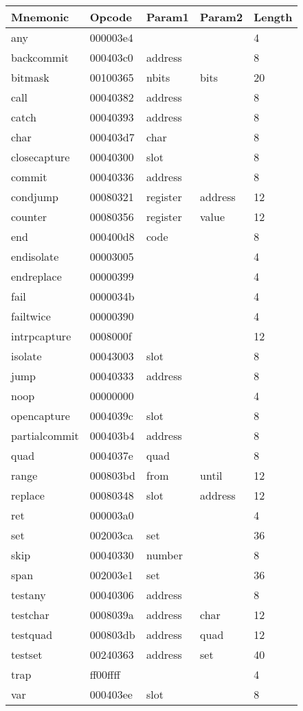 
\begin{center}
\label{tab:naig_bytecode}
\begin{longtable}{lllll}
\textbf{Mnemonic} & \textbf{Opcode} & \textbf{Param1} & \textbf{Param2} & \textbf{Length} \\
\endhead
any & 000003e4 &  &   & 4 \\
backcommit & 000403c0 & address &   & 8 \\
bitmask & 00100365 & nbits & bits  & 20 \\
call & 00040382 & address &   & 8 \\
catch & 00040393 & address &   & 8 \\
char & 000403d7 & char &   & 8 \\
closecapture & 00040300 & slot &   & 8 \\
commit & 00040336 & address &   & 8 \\
condjump & 00080321 & register & address  & 12 \\
counter & 00080356 & register & value  & 12 \\
end & 000400d8 & code &   & 8 \\
endisolate & 00003005 &  &   & 4 \\
endreplace & 00000399 &  &   & 4 \\
fail & 0000034b &  &   & 4 \\
failtwice & 00000390 &  &   & 4 \\
intrpcapture & 0008000f &  &   & 12 \\
isolate & 00043003 & slot &   & 8 \\
jump & 00040333 & address &   & 8 \\
noop & 00000000 &  &   & 4 \\
opencapture & 0004039c & slot &   & 8 \\
partialcommit & 000403b4 & address &   & 8 \\
quad & 0004037e & quad &   & 8 \\
range & 000803bd & from & until  & 12 \\
replace & 00080348 & slot & address  & 12 \\
ret & 000003a0 &  &   & 4 \\
set & 002003ca & set &   & 36 \\
skip & 00040330 & number &   & 8 \\
span & 002003e1 & set &   & 36 \\
testany & 00040306 & address &   & 8 \\
testchar & 0008039a & address & char  & 12 \\
testquad & 000803db & address & quad  & 12 \\
testset & 00240363 & address & set  & 40 \\
trap & ff00ffff &  &   & 4 \\
var & 000403ee & slot &   & 8 \\
\end{longtable}
\end{center}
